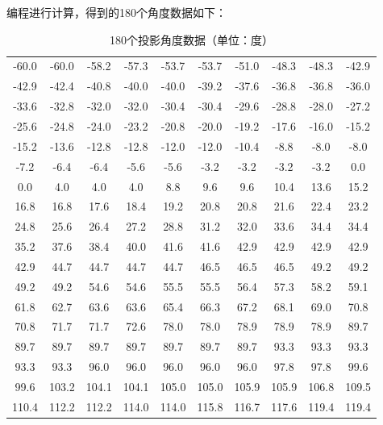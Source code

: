 编程进行计算，得到的180个角度数据如下：
   \begin{table}[H]
       \centering
       \caption{180个投影角度数据（单位：度）}
       \begin{tabular}{cccccccccc}
           \toprule
           -60.0 & -60.0 & -58.2 & -57.3 & -53.7 & -53.7 & -51.0 & -48.3 & -48.3 & -42.9 \\
           -42.9 & -42.4 & -40.8 & -40.0 & -40.0 & -39.2 & -37.6 & -36.8 & -36.8 & -36.0 \\
           -33.6 & -32.8 & -32.0 & -32.0 & -30.4 & -30.4 & -29.6 & -28.8 & -28.0 & -27.2 \\
           -25.6 & -24.8 & -24.0 & -23.2 & -20.8 & -20.0 & -19.2 & -17.6 & -16.0 & -15.2 \\
           -15.2 & -13.6 & -12.8 & -12.8 & -12.0 & -12.0 & -10.4 & -8.8 & -8.0 & -8.0 \\
           -7.2 & -6.4 & -6.4 & -5.6 & -5.6 & -3.2 & -3.2 & -3.2 & -3.2 & 0.0 \\
           0.0 & 4.0 & 4.0 & 4.0 & 8.8 & 9.6 & 9.6 & 10.4 & 13.6 & 15.2 \\
           16.8 & 16.8 & 17.6 & 18.4 & 19.2 & 20.8 & 20.8 & 21.6 & 22.4 & 23.2 \\
           24.8 & 25.6 & 26.4 & 27.2 & 28.8 & 31.2 & 32.0 & 33.6 & 34.4 & 34.4 \\
           35.2 & 37.6 & 38.4 & 40.0 & 41.6 & 41.6 & 42.9 & 42.9 & 42.9 & 42.9 \\
           42.9 & 44.7 & 44.7 & 44.7 & 44.7 & 46.5 & 46.5 & 46.5 & 49.2 & 49.2 \\
           49.2 & 49.2 & 54.6 & 54.6 & 55.5 & 55.5 & 56.4 & 57.3 & 58.2 & 59.1 \\
           61.8 & 62.7 & 63.6 & 63.6 & 65.4 & 66.3 & 67.2 & 68.1 & 69.0 & 70.8 \\
           70.8 & 71.7 & 71.7 & 72.6 & 78.0 & 78.0 & 78.9 & 78.9 & 78.9 & 89.7 \\
           89.7 & 89.7 & 89.7 & 89.7 & 89.7 & 89.7 & 89.7 & 93.3 & 93.3 & 93.3 \\
           93.3 & 93.3 & 96.0 & 96.0 & 96.0 & 96.0 & 96.0 & 97.8 & 97.8 & 99.6 \\
           99.6 & 103.2 & 104.1 & 104.1 & 105.0 & 105.0 & 105.9 & 105.9 & 106.8 & 109.5 \\
           110.4 & 112.2 & 112.2 & 114.0 & 114.0 & 115.8 & 116.7 & 117.6 & 119.4 & 119.4 \\
           \bottomrule
       \end{tabular}
   \end{table}


